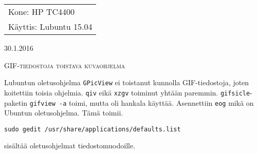 \documentclass[main.tex]{subfiles}
\begin{document}
\thispagestyle{empty}
\begin{tabular}[t]{l}
Kone: HP TC4400\\
Käyttis: Lubuntu 15.04
\end{tabular}
\hfill 30.1.2016

{\scshape\Large{GIF-tiedostoja toistava kuvaohjelma}}
 
Lubuntun oletusohjelma \texttt{GPicView} ei toistanut kunnolla GIF-tiedostoja, joten koitettiin toisia ohjelmia. \texttt{qiv} eikä \texttt{xzgv} toiminut yhtään paremmin. \texttt{gifsicle}-paketin \texttt{gifview -a} toimi, mutta oli hankala käyttää. Asennettiin \texttt{eog} mikä on Ubuntun oletusohjelma. Tämä toimii.

\begin{lstlisting}
sudo gedit /usr/share/applications/defaults.list
\end{lstlisting}

sisältää oletusohjelmat tiedostomuodoille.
\end{document}
